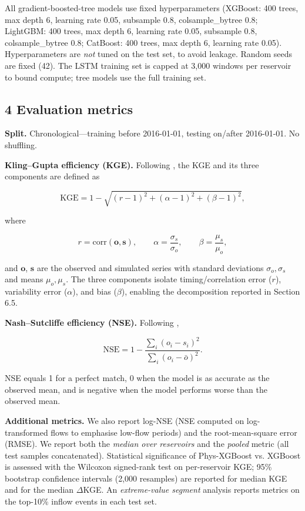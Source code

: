 \documentclass[journal]{ascelike-new}
\begin{document}
All gradient-boosted-tree models use fixed hyperparameters (XGBoost: 400 trees, max depth 6, learning rate 0.05, subsample 0.8, colsample\_bytree 0.8; LightGBM: 400 trees, max depth 6, learning rate 0.05, subsample 0.8, colsample\_bytree 0.8; CatBoost: 400 trees, max depth 6, learning rate 0.05). Hyperparameters are \emph{not} tuned on the test set, to avoid leakage. Random seeds are fixed (42). The LSTM training set is capped at 3,000 windows per reservoir to bound compute; tree models use the full training set.


\subsection{4 Evaluation metrics}


\textbf{Split.} Chronological---training before 2016-01-01, testing on/after 2016-01-01. No shuffling.


\textbf{Kling--Gupta efficiency (KGE).} Following \citet{Gupta2009}, the KGE and its three components are defined as


\begin{equation}\text{KGE} = 1 - \sqrt{(r-1)^2 + (\alpha-1)^2 + (\beta-1)^2}, \tag{9}\end{equation}


where


\begin{equation}r = \text{corr}(\mathbf{o}, \mathbf{s}), \qquad \alpha = \frac{\sigma_s}{\sigma_o}, \qquad \beta = \frac{\mu_s}{\mu_o}, \tag{10}\end{equation}


and $\mathbf{o}$, $\mathbf{s}$ are the observed and simulated series with standard deviations $\sigma_o, \sigma_s$ and means $\mu_o, \mu_s$. The three components isolate timing/correlation error ($r$), variability error ($\alpha$), and bias ($\beta$), enabling the decomposition reported in Section 6.5.


\textbf{Nash--Sutcliffe efficiency (NSE).} Following \citet{Nash1970},


\begin{equation}\text{NSE} = 1 - \frac{\sum_{i}(o_i - s_i)^2}{\sum_{i}(o_i - \bar{o})^2}. \tag{11}\end{equation}


NSE equals 1 for a perfect match, 0 when the model is as accurate as the observed mean, and is negative when the model performs worse than the observed mean.


\textbf{Additional metrics.} We also report log-NSE (NSE computed on log-transformed flows to emphasise low-flow periods) and the root-mean-square error (RMSE). We report both the \emph{median over reservoirs} and the \emph{pooled} metric (all test samples concatenated). Statistical significance of Phys-XGBoost vs. XGBoost is assessed with the Wilcoxon signed-rank test on per-reservoir KGE; 95\% bootstrap confidence intervals (2,000 resamples) are reported for median KGE and for the median $\Delta$KGE. An \emph{extreme-value segment} analysis reports metrics on the top-10\% inflow events in each test set.
\end{document}
